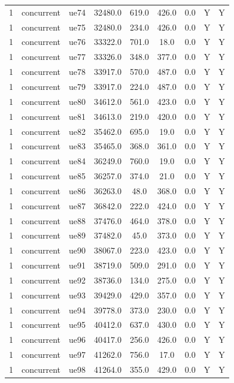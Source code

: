 \begin{table}[ht]
\begin{tabular}{|c|c|c|c|c|c|c|c|c|}
1 & concurrent & ue74 & 32480.0 & 619.0 & 426.0 & 0.0 & Y & Y \\
1 & concurrent & ue75 & 32480.0 & 234.0 & 426.0 & 0.0 & Y & Y \\
1 & concurrent & ue76 & 33322.0 & 701.0 & 18.0 & 0.0 & Y & Y \\
1 & concurrent & ue77 & 33326.0 & 348.0 & 377.0 & 0.0 & Y & Y \\
1 & concurrent & ue78 & 33917.0 & 570.0 & 487.0 & 0.0 & Y & Y \\
1 & concurrent & ue79 & 33917.0 & 224.0 & 487.0 & 0.0 & Y & Y \\
1 & concurrent & ue80 & 34612.0 & 561.0 & 423.0 & 0.0 & Y & Y \\
1 & concurrent & ue81 & 34613.0 & 219.0 & 420.0 & 0.0 & Y & Y \\
1 & concurrent & ue82 & 35462.0 & 695.0 & 19.0 & 0.0 & Y & Y \\
1 & concurrent & ue83 & 35465.0 & 368.0 & 361.0 & 0.0 & Y & Y \\
1 & concurrent & ue84 & 36249.0 & 760.0 & 19.0 & 0.0 & Y & Y \\
1 & concurrent & ue85 & 36257.0 & 374.0 & 21.0 & 0.0 & Y & Y \\
1 & concurrent & ue86 & 36263.0 & 48.0 & 368.0 & 0.0 & Y & Y \\
1 & concurrent & ue87 & 36842.0 & 222.0 & 424.0 & 0.0 & Y & Y \\
1 & concurrent & ue88 & 37476.0 & 464.0 & 378.0 & 0.0 & Y & Y \\
1 & concurrent & ue89 & 37482.0 & 45.0 & 373.0 & 0.0 & Y & Y \\
1 & concurrent & ue90 & 38067.0 & 223.0 & 423.0 & 0.0 & Y & Y \\
1 & concurrent & ue91 & 38719.0 & 509.0 & 291.0 & 0.0 & Y & Y \\
1 & concurrent & ue92 & 38736.0 & 134.0 & 275.0 & 0.0 & Y & Y \\
1 & concurrent & ue93 & 39429.0 & 429.0 & 357.0 & 0.0 & Y & Y \\
1 & concurrent & ue94 & 39778.0 & 373.0 & 230.0 & 0.0 & Y & Y \\
1 & concurrent & ue95 & 40412.0 & 637.0 & 430.0 & 0.0 & Y & Y \\
1 & concurrent & ue96 & 40417.0 & 256.0 & 426.0 & 0.0 & Y & Y \\
1 & concurrent & ue97 & 41262.0 & 756.0 & 17.0 & 0.0 & Y & Y \\
1 & concurrent & ue98 & 41264.0 & 355.0 & 429.0 & 0.0 & Y & Y \\

\end{tabular}
\end{table}
